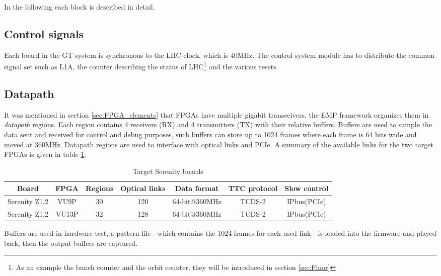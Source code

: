 \documentclass[../../main.tex]{subfiles}
\begin{document}
In the following each block is described in detail.

\subsection{Control signals}
\label{sec:EMP-control}

Each board in the GT system is synchronous to the LHC clock, which is 40MHz. The control system module has to distribute the common signal set such as L1A, the counter describing the status of LHC\footnote{As an example the bunch counter and the orbit counter, they will be introduced in section \ref{sec:Finor}} and the various resets. 


\subsection{Datapath}
\label{sec:EMP-data}
It was mentioned in section \ref{sec:FPGA_elements} that FPGAs have multiple gigabit transceivers, the EMP framework organizes them in \textit{datapath} regions. Each region contains 4 receivers (RX) and 4 transmitters (TX) with their relative buffers. Buffers are used to sample the data sent and received for control and debug purposes, such buffers can store up to 1024 frames where each frame is 64 bits wide and moved at 360MHz. Datapath regions are used to interface with optical links and PCIe.  
A summary of the available links for the two target FPGAs is given in table \ref{tab:EMP-link}.

\begin{center}
    \begin{table}[h]
    \begin{tabular}{|c|c|c|c|c|c|c|}
        \hline
        Board & FPGA & Regions & Optical links & Data format & TTC protocol & Slow control  \\ 
        \hline \hline
        Serenity Z1.2 & VU9P  & 30  & 120 & 64-bit@360MHz & TCDS-2 & IPbus(PCIe)  \\
        Serenity Z1.2 & VU13P & 32  & 128 & 64-bit@360MHz & TCDS-2 & IPbus(PCIe)  \\
        \hline
    \end{tabular}
    \caption{Target Serenity boards}
    \label{tab:EMP-link}
    \end{table}
\end{center}

Buffers are used in hardware test, a pattern file - which contains the 1024 frames for each used link - is loaded into the firmware and played back, then the output buffers are captured.  
\end{document}
